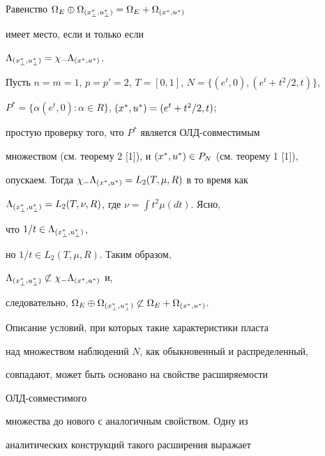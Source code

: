  


\begin{cor} 


Равенство $\Omega_E\oplus\Omega_{\myxu{\bot}}= 


\Omega_E+\Omega_{\myxu{}}$ 


имеет место, если и только если 


$\Lambda_{{(x^*_{\bot},u^*_{\bot})}}=\chi_-\Lambda_{{(x^*_{},u^*_{})}}$. 


\end{cor} 


 


\begin{exam} 


Пусть $n=m=1$, $p=p'=2$, $T=[0,1]$, $N=\{(e^t,0),(e^t+t^2/2,t)\}$, 


$P^*=\{\alpha(e^t,0):\alpha\in R\}$, ${(x^*_{},u^*_{})}=(e^t+t^2/2,t)$; 


простую проверку того, что $P^*$ является ОЛД-совместимым 


множеством (см. теорему 2 [1]), и ${(x^*_{},u^*_{})}\in P_N$ (см. теорему 1 [1]),


опускаем. Тогда $\chi_-\Lambda_{{(x^*_{},u^*_{})}}=L_2(T,\mu,R)$ в то время как 


$\Lambda_{{(x^*_{\bot},u^*_{\bot})}}=L_2(T,\nu,R)$, где $\nu=\int t^2\mu(dt)$. Ясно, 


что $1/t\in\Lambda_{{(x^*_{\bot},u^*_{\bot})}}$, 


но $1/t\in L_2(T,\mu,R)$. Таким образом, 


$\Lambda_{{(x^*_{\bot},u^*_{\bot})}}\not\subset\chi_-\Lambda_{{(x^*_{},u^*_{})}}$ и, 


следовательно, $\Omega_E\oplus\Omega_{\myxu{\bot}}\not\subset 


\Omega_E+\Omega_{\myxu{}}$. 


\end{exam} 


 


Описание условий, при которых такие характеристики пласта 


над множеством наблюдений $N$, как обыкновенный и распределенный, 


совпадают, может быть основано на свойстве расширяемости 


ОЛД-совместимого 


множества до нового с аналогичным свойством. Одну из 


аналитических конструкций такого расширения выражает 


